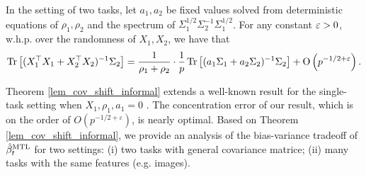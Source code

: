 \begin{theorem}[Informal]\label{lem_cov_shift_informal}
	In the setting of two tasks, let $a_1, a_2$ be fixed values solved from deterministic equations of $\rho_1, \rho_2$ and the spectrum of $\Sigma_1^{1/2}\Sigma_2^{-1}\Sigma_1^{1/2}$.
	For any constant ${\varepsilon}>0$, w.h.p. over the randomness of $X_1, X_2$, we have that
	\begin{align}\label{eq_introX1X2}
		\operatorname{Tr}\left[(X_1^{\top}X_1 + X_2^{\top}X_2)^{-1}\Sigma_2\right] = \frac{1}{\rho_1+\rho_2}\cdot \frac1p\operatorname{Tr}\left[ (a_1 \Sigma_1 + a_2\Sigma_2)^{-1} \Sigma_2\right] +\operatorname{O}\left({p^{-1/2+\varepsilon}}\right).
	\end{align}
\end{theorem}

Theorem \ref{lem_cov_shift_informal} extends a well-known result for the single-task setting when $X_1, \rho_1, a_1 = 0$ \cite{S07}.
The concentration error of our result, which is on the order of $O(p^{-1/2+\varepsilon})$, is nearly optimal.
Based on Theorem \ref{lem_cov_shift_informal}, we provide an analysis of the bias-variance tradeoff of $\hat{\beta}_t^{\text{MTL}}$ for two settings:
(i) two tasks with general covariance matrice; (ii) many tasks with the same features (e.g. images).

